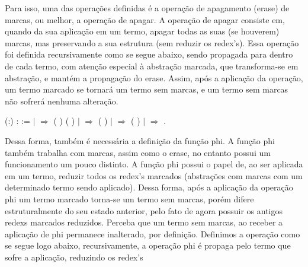  Para isso, uma das operações definidas é a operação de apagamento (erase) de marcas, ou melhor,
a operação de apagar. A operação de apagar consiste em, quando da sua aplicação em um termo, apagar
todas as suas (se houverem) marcas, mas preservando a sua estrutura (sem reduzir os redex's). Essa operação
foi definida recursivamente como se segue abaixo, sendo propagada para dentro de cada termo, com atenção
especial à abstração marcada, que transforma-se em abstração, e mantém a propagação do erase. Assim, 
após a aplicação da operação, um termo marcado se tornará um termo sem marcas, e um termo sem marcas não
sofrerá nenhuma alteração.\begin{coqdoccode}
\coqdocemptyline
\coqdocnoindent
{}  (:) :  :=\coqdoceol
\coqdocindent{1.00em}
  \coqdoceol
\coqdocindent{1.00em}
\ensuremath{|}    \ensuremath{\Rightarrow}  ( ) ( )\coqdoceol
\coqdocindent{1.00em}
\ensuremath{|}   \ensuremath{\Rightarrow}  ( )\coqdoceol
\coqdocindent{1.00em}
\ensuremath{|}   \ensuremath{\Rightarrow}  ( )\coqdoceol
\coqdocindent{1.00em}
\ensuremath{|} \coqdocvar{\_} \ensuremath{\Rightarrow} \coqdoceol
\coqdocindent{1.00em}
.\coqdoceol
\coqdocemptyline
\coqdocemptyline
\coqdocemptyline
\end{coqdoccode}
Dessa forma, também é necessária a definição da função phi. A função phi também trabalha
com marcas, assim como o erase, no entanto possui um funcionamento um pouco distinto. A função phi
possui o papel de, ao ser aplicada em um termo, reduzir todos os redex's marcados (abstrações
com marcas com um determinado termo sendo aplicado). Dessa forma, após a aplicação da operação phi
um termo marcado torna-se um termo sem marcas, porém difere estruturalmente do seu estado anterior,
pelo fato de agora possuir os antigos redexs marcados reduzidos. Perceba que um termo sem marcas, ao
receber a aplicação de phi permanece inalterado, por definição. Definimos a operação como se segue logo
abaixo, recursivamente, a operação phi é propaga pelo termo que sofre a aplicação, reduzindo os redex's
